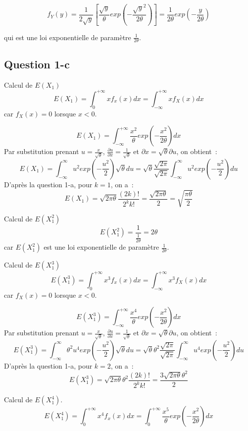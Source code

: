 \documentclass[]{book}
\theoremstyle{definition}
\begin{document}
$$
f_{Y}(y) = \frac{1}{2\sqrt{y}} \left[ \frac{\sqrt{y}}{\theta}exp \left( -\frac{\sqrt{y}^2}{2\theta} \right) \right] = \frac{1}{2\theta} exp \left( -\frac{y}{2\theta} \right)
$$

qui est une loi exponentielle de param\`etre $\frac{1}{2\theta}$.

\subsection*{Question 1-c}
Calcul de $E(X_1)$
$$
E(X_1) = \int_{0}^{+\infty} x f_{x}(x) dx = \int_{-\infty}^{+\infty} x f_{X}(x) dx
$$
car $f_{X}(x) = 0$ lorsque $x < 0$.

$$
E(X_1) = \int_{-\infty}^{+\infty} \frac{x^2}{\theta} exp \left( -\frac{x^2}{2\theta}\right) dx
$$
Par substitution prenant $u = \frac{x}{\sqrt{\theta}}$, $\frac{\partial u}{\partial x} = \frac{1}{\sqrt{\theta}}$ et ${\partial x} = \sqrt{\theta}{\partial u}$, on obtient~:
$$
E(X_1) = \int_{-\infty}^{\infty} u^2 exp \left( -\frac{u^2}{2}\right) \sqrt{\theta} du = \sqrt{\theta} \frac{\sqrt{2\pi}}{\sqrt{2\pi}} \int_{-\infty}^{\infty} u^2 exp \left( -\frac{u^2}{2}\right)  du 
$$
D'apr\`es la question 1-a, pour $k=1$, on a~:
$$
E(X_1) = \sqrt{2\pi\theta}\frac{(2k)!}{2^k k!} = \frac{\sqrt{2\pi\theta}}{2} = \sqrt{\frac{\pi\theta}{2}}
$$

Calcul de $E(X_1^2)$
$$
E(X_1^2) = \frac{1}{\frac{1}{2\theta}} = {2\theta}
$$
car $E(X_1^2)$ est une loi exponentielle de param\`etre $\frac{1}{2\theta}$.


Calcul de $E(X_1^3)$
$$
E(X_1^3) = \int_{0}^{+\infty} x^3 f_{x}(x) dx = \int_{-\infty}^{+\infty} x^3 f_{X}(x) dx
$$
car $f_{X}(x) = 0$ lorsque $x < 0$.

$$
E(X_1^3) = \int_{-\infty}^{+\infty} \frac{x^4}{\theta} exp \left( -\frac{x^2}{2\theta}\right) dx
$$
Par substitution prenant $u = \frac{x}{\sqrt{\theta}}$, $\frac{\partial u}{\partial x} = \frac{1}{\sqrt{\theta}}$ et ${\partial x} = \sqrt{\theta}{\partial u}$, on obtient~:
$$
E(X_1^3) = \int_{-\infty}^{\infty} \theta^2 u^4 exp \left( -\frac{u^2}{2}\right) \sqrt{\theta} du = \sqrt{\theta}\theta^2 \frac{\sqrt{2\pi}}{\sqrt{2\pi}} \int_{-\infty}^{\infty} u^4 exp \left( -\frac{u^2}{2}\right)  du 
$$
D'apr\`es la question 1-a, pour $k=2$, on a~:
$$
E(X_1^3) = \sqrt{2\pi\theta}\theta^2\frac{(2k)!}{2^k k!} = \frac{3\sqrt{2\pi\theta}\theta^2}{2} 
$$

Calcul de $E(X_1^4)$.
$$
E(X_1^4) = \int_{0}^{+\infty} x^4 f_{x}(x) dx = \int_{0}^{+\infty} \frac{x^5}{\theta} exp \left( -\frac{x^2}{2\theta}\right) dx 
$$
\end{document}
